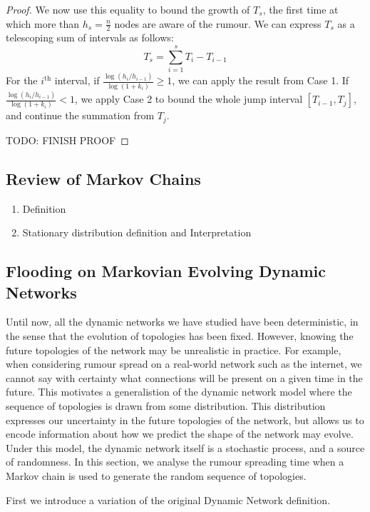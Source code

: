 \begin{proof}
	We now use this equality to bound the growth of $T_s$, the first time at which more than $h_s = \frac{n}{2}$ nodes are aware of the rumour. We can express $T_s$ as a telescoping sum of intervals as follows:
	$$
		T_s = \sum_{i=1}^s T_i - T_{i-1}
	$$
	For the $i^\text{th}$ interval, if $\frac{\log (h_i/h_{i-1})}{\log(1+k_i)} \geq 1$, we can apply the result from Case 1. If $\frac{\log (h_i/h_{i-1})}{\log(1+k_i)} < 1$, we apply Case 2 to bound the whole jump interval $[T_{i-1}, T_j]$, and continue the summation from $T_j$. %

	TODO: FINISH PROOF
	
\end{proof}

\subsection{Review of Markov Chains}

\begin{enumerate}
	\item Definition
	\item Stationary distribution definition and Interpretation
\end{enumerate}

\subsection{Flooding on Markovian Evolving Dynamic Networks}

Until now, all the dynamic networks we have studied have been deterministic, in the sense that the evolution of topologies has been fixed. However, knowing the future topologies of the network may be unrealistic in practice. For example, when considering rumour spread on a real-world network such as the internet, we cannot say with certainty what connections will be present on a given time in the future. This motivates a generalistion of the dynamic network model where the sequence of topologies is drawn from some distribution. This distribution expresses our uncertainty in the future topologies of the network, but allows us to encode information about how we predict the shape of the network may evolve. Under this model, the dynamic network itself is a stochastic process, and a source of randomness. In this section, we analyse the rumour spreading time when a Markov chain is used to  generate the random sequence of topologies.

First we introduce a variation of the original Dynamic Network definition.

